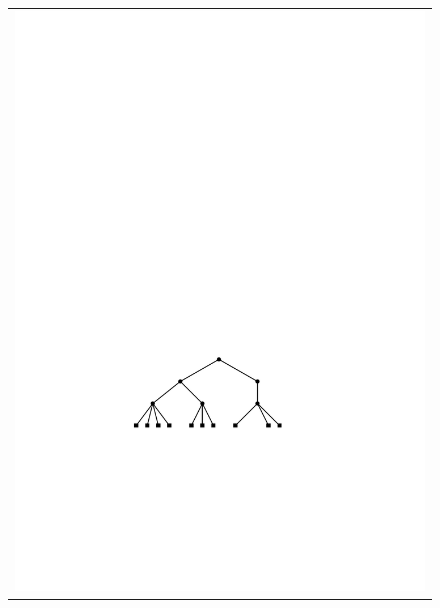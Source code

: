 \begin{figure}
\begin{center}
\begin{tabular}{c}
			\includegraphics[height=\FifthHeightScaleIfNeeded]{figs/24tree-remove-3} \\

\end{tabular}
\end{center}
\end{figure}
